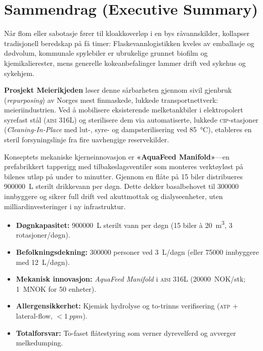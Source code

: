 \section*{Sammendrag (Executive Summary)}

Når flom eller sabotasje fører til kloakkoverløp i en bys råvannskilder, kollapser tradisjonell beredskap på få timer: Flaskevannlogistikken kveles av emballasje og dødvolum, kommunale spylebiler er ubrukelige grunnet biofilm og kjemikalierester, mens generelle kokeanbefalinger lammer drift ved sykehus og sykehjem.

\textbf{Prosjekt Meierikjeden} løser denne sårbarheten gjennom sivil gjenbruk (\textit{repurposing}) av Norges mest finmaskede, lukkede transportnettverk: meieriindustrien. Ved å mobilisere eksisterende melketankbiler i elektropolert syrefast stål (\textsc{aisi} 316L) og sterilisere dem via automatiserte, lukkede \textsc{cip}-stasjoner (\textit{Cleaning-In-Place} med lut-, syre- og dampsterilisering ved \SI{85}{\celsius}), etableres en steril forsyningslinje fra fire uavhengige reservekilder.

Konseptets mekaniske kjerneinnovasjon er \textbf{«AquaFeed Manifold»}---en prefabrikkert tapperigg med tilbakeslagsventiler som monteres verktøyløst på bilenes utløp på under to minutter. Gjennom en flåte på 15 biler distribueres \SI{900000}{\liter} sterilt drikkevann per døgn. Dette dekker basalbehovet til \num{300000} innbyggere og sikrer full drift ved akuttmottak og dialyseenheter, uten milliardinvesteringer i ny infrastruktur.

\begin{tcolorbox}[colback=boxbg, colframe=navyblue, arc=2mm, title=\textbf{Hovedtall og nøkkeldata}, fonttitle=\bfseries\sffamily]
\begin{itemize}[leftmargin=1.5em, itemsep=0.1em]
    \item \textbf{Døgnkapasitet:} \SI{900000}{\liter} sterilt vann per døgn (15 biler à \SI{20}{\cubic\meter}, 3 rotasjoner/døgn).
    \item \textbf{Befolkningsdekning:} \num{300000} personer ved \SI{3}{\liter}/døgn (eller \num{75000} innbyggere med \SI{12}{\liter}/døgn).
    \item \textbf{Mekanisk innovasjon:} \textit{AquaFeed Manifold} i \textsc{aisi} 316L (\SI{20000}{NOK}/stk; \SI{1}{MNOK} for 50 enheter).
    \item \textbf{Allergensikkerhet:} Kjemisk hydrolyse og to-trinns verifisering (\textsc{atp} + lateral-flow, $< \SI{1}{ppm}$).
    \item \textbf{Totalforsvar:} To-faset flåtestyring som verner dyrevelferd og avverger melkedumping.
\end{itemize}
\end{tcolorbox}
